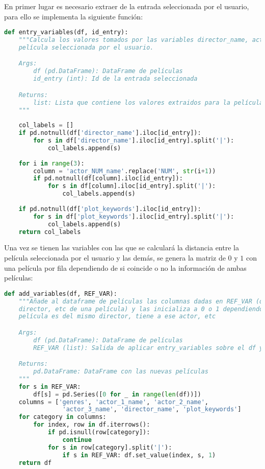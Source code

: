 En primer lugar es necesario extraer de la entrada seleccionada por el usuario, para ello se implementa la siguiente función:
\begin{lstlisting}[language=Python, caption= Variables utilizadas para la creación de la matriz.]
def entry_variables(df, id_entry): 
    """Calcula los valores tomados por las variables director_name, actor_[1,2,3]_name y plot_keywords para la
    película seleccionada por el usuario.

    Args:
        df (pd.DataFrame): DataFrame de películas
        id_entry (int): Id de la entrada seleccionada

    Returns:
        list: Lista que contiene los valores extraidos para la película seleccionada
    """
    
    col_labels = []    
    if pd.notnull(df['director_name'].iloc[id_entry]):
        for s in df['director_name'].iloc[id_entry].split('|'):
            col_labels.append(s)
            
    for i in range(3):
        column = 'actor_NUM_name'.replace('NUM', str(i+1))
        if pd.notnull(df[column].iloc[id_entry]):
            for s in df[column].iloc[id_entry].split('|'):
                col_labels.append(s)
                
    if pd.notnull(df['plot_keywords'].iloc[id_entry]):
        for s in df['plot_keywords'].iloc[id_entry].split('|'):
            col_labels.append(s)
    return col_labels
\end{lstlisting}

Una vez se tienen las variables con las que se calculará la distancia entre la película seleccionada por el usuario y las demás, se genera la matriz de $0$ y $1$ con una película por fila dependiendo de si coincide o no la información de ambas películas:

\begin{lstlisting}[language=Python, caption= Creación de la matriz de coordenadas de las películas.]
def add_variables(df, REF_VAR):
    """Añade al dataframe de películas las columnas dadas en REF_VAR (que serán el 
    director, etc de una película) y las inicializa a 0 o 1 dependiendo de si la 
    película es del mismo director, tiene a ese actor, etc

    Args:
        df (pd.DataFrame): DataFrame de películas
        REF_VAR (list): Salida de aplicar entry_variables sobre el df y una película

    Returns:
        pd.DataFrame: DataFrame con las nuevas películas
    """
    for s in REF_VAR: 
        df[s] = pd.Series([0 for _ in range(len(df))])
    columns = ['genres', 'actor_1_name', 'actor_2_name',
                'actor_3_name', 'director_name', 'plot_keywords']
    for category in columns:
        for index, row in df.iterrows():
            if pd.isnull(row[category]): 
                continue
            for s in row[category].split('|'):
                if s in REF_VAR: df.set_value(index, s, 1)            
    return df
\end{lstlisting}

